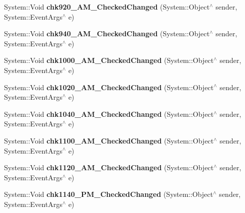 \begin{DoxyCompactItemize}
System\+::\+Void {\bfseries chk920\+\_\+A\+M\+\_\+\+Checked\+Changed} (System\+::\+Object$^\wedge$ sender, System\+::\+Event\+Args$^\wedge$ e)
\item 
\mbox{\label{class_project1_1_1_my_form_a3309cad233c41f364f9bb046f3391544}} 
System\+::\+Void {\bfseries chk940\+\_\+A\+M\+\_\+\+Checked\+Changed} (System\+::\+Object$^\wedge$ sender, System\+::\+Event\+Args$^\wedge$ e)
\item 
\mbox{\label{class_project1_1_1_my_form_ad171aad90ed4e42537739c79633ad969}} 
System\+::\+Void {\bfseries chk1000\+\_\+A\+M\+\_\+\+Checked\+Changed} (System\+::\+Object$^\wedge$ sender, System\+::\+Event\+Args$^\wedge$ e)
\item 
\mbox{\label{class_project1_1_1_my_form_a46d19b32c75c5e8df2eca92bf4602c28}} 
System\+::\+Void {\bfseries chk1020\+\_\+A\+M\+\_\+\+Checked\+Changed} (System\+::\+Object$^\wedge$ sender, System\+::\+Event\+Args$^\wedge$ e)
\item 
\mbox{\label{class_project1_1_1_my_form_a730d97461c3976b82855358c9de2a38e}} 
System\+::\+Void {\bfseries chk1040\+\_\+A\+M\+\_\+\+Checked\+Changed} (System\+::\+Object$^\wedge$ sender, System\+::\+Event\+Args$^\wedge$ e)
\item 
\mbox{\label{class_project1_1_1_my_form_a0af089c55d9137d9d2d891d26432bd64}} 
System\+::\+Void {\bfseries chk1100\+\_\+A\+M\+\_\+\+Checked\+Changed} (System\+::\+Object$^\wedge$ sender, System\+::\+Event\+Args$^\wedge$ e)
\item 
\mbox{\label{class_project1_1_1_my_form_a5a33432c5f1ff8d148b50b14a308d938}} 
System\+::\+Void {\bfseries chk1120\+\_\+A\+M\+\_\+\+Checked\+Changed} (System\+::\+Object$^\wedge$ sender, System\+::\+Event\+Args$^\wedge$ e)
\item 
\mbox{\label{class_project1_1_1_my_form_aa5955ee60b5628345a6acbb8f433e8a9}} 
System\+::\+Void {\bfseries chk1140\+\_\+P\+M\+\_\+\+Checked\+Changed} (System\+::\+Object$^\wedge$ sender, System\+::\+Event\+Args$^\wedge$ e)
\item 

\end{DoxyCompactItemize}
